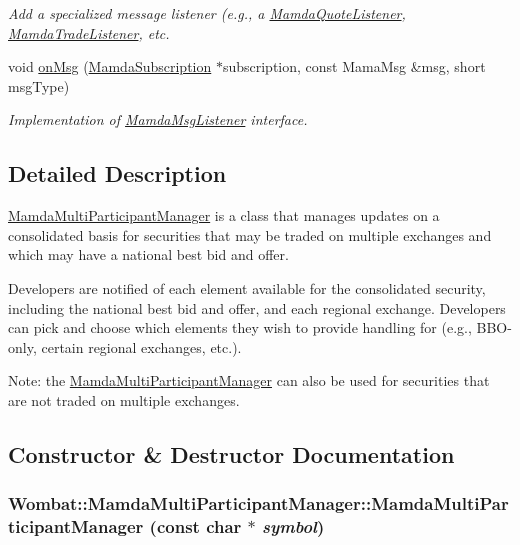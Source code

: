 \begin{CompactItemize}
\begin{CompactList}\small\item\em Add a specialized message listener (e.g., a \hyperlink{classWombat_1_1MamdaQuoteListener}{Mamda\-Quote\-Listener}, \hyperlink{classWombat_1_1MamdaTradeListener}{Mamda\-Trade\-Listener}, etc. \item\end{CompactList}\item 
void \hyperlink{classWombat_1_1MamdaMultiParticipantManager_7c7586474bb08e9d9d05198459fdf245}{on\-Msg} (\hyperlink{classWombat_1_1MamdaSubscription}{Mamda\-Subscription} $\ast$subscription, const Mama\-Msg \&msg, short msg\-Type)
\begin{CompactList}\small\item\em Implementation of \hyperlink{classWombat_1_1MamdaMsgListener}{Mamda\-Msg\-Listener} interface. \item\end{CompactList}\end{CompactItemize}


\subsection{Detailed Description}
\hyperlink{classWombat_1_1MamdaMultiParticipantManager}{Mamda\-Multi\-Participant\-Manager} is a class that manages updates on a consolidated basis for securities that may be traded on multiple exchanges and which may have a national best bid and offer. 

Developers are notified of each element available for the consolidated security, including the national best bid and offer, and each regional exchange. Developers can pick and choose which elements they wish to provide handling for (e.g., BBO-only, certain regional exchanges, etc.).

Note: the \hyperlink{classWombat_1_1MamdaMultiParticipantManager}{Mamda\-Multi\-Participant\-Manager} can also be used for securities that are not traded on multiple exchanges. 



\subsection{Constructor \& Destructor Documentation}
\hypertarget{classWombat_1_1MamdaMultiParticipantManager_799180862cc602700bde5e4cda9bddb4}{
\subsubsection[MamdaMultiParticipantManager]{\setlength{\rightskip}{0pt plus 5cm}Wombat::Mamda\-Multi\-Participant\-Manager::Mamda\-Multi\-Participant\-Manager (const char $\ast$ {\em symbol})}}
\label{classWombat_1_1MamdaMultiParticipantManager_799180862cc602700bde5e4cda9bddb4}


